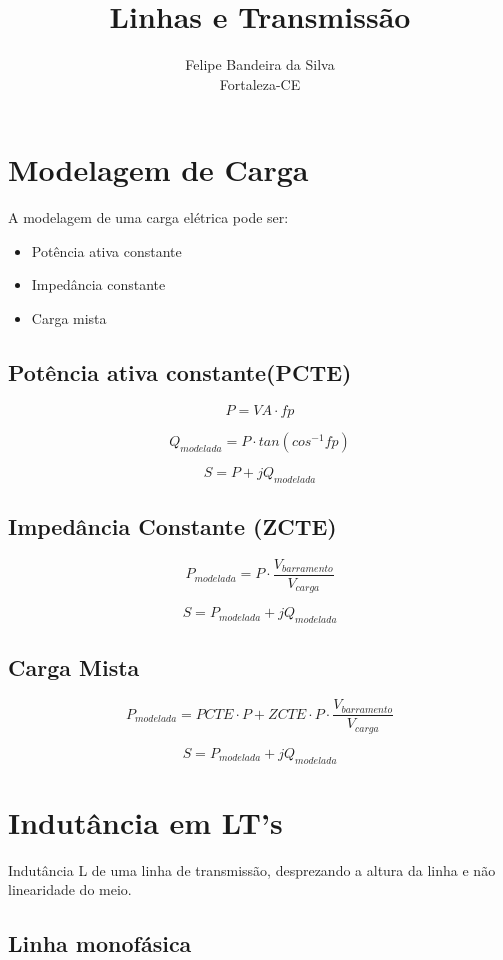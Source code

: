 \documentclass[a4paper, 10pt, twocolumn]{article}
\title{Linhas e Transmissão}
\author{Felipe Bandeira da Silva\\Fortaleza-CE}
\begin{document}
\maketitle
\section{Modelagem de Carga}

A modelagem de uma carga elétrica pode ser:

\begin{itemize}
\item Potência ativa constante
\item Impedância constante
\item Carga mista
\end{itemize}

\subsection{Potência ativa constante(PCTE)}
    
    $$
        P = VA \cdot fp
    $$
    
    $$
        Q_{modelada} = P \cdot tan(cos^{-1}fp)
    $$
    
    $$
        S = P+jQ_{modelada}
    $$

\subsection{Impedância Constante (ZCTE)}
    $$
        P_{modelada} = P \cdot \frac{V_{barramento}}{V_{carga}}
    $$
    
    $$
        S = P_{modelada} + jQ_{modelada}  
    $$

\subsection{Carga Mista}
    $$
        P_{modelada} =PCTE \cdot P +  ZCTE \cdot  P \cdot \frac{V_{barramento}}{V_{carga}}
    $$

    $$
       S = P_{modelada} + jQ_{modelada}  
    $$

\section{Indutância em LT's}

Indutância L de uma linha de transmissão, desprezando a altura
da linha e não linearidade do meio.

\subsection{Linha monofásica}
\end{document}
